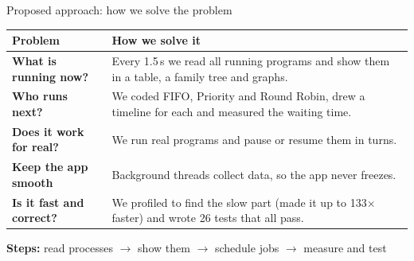 \documentclass[aspectratio=169,11pt]{beamer}
\begin{document}
\begin{frame}{Proposed approach: how we solve the problem}
  \centering
  \begin{tabular}{>{\raggedright\arraybackslash}p{}>{\raggedright\arraybackslash}p{}}
    \toprule
    \textbf{Problem} & \textbf{How we solve it} \\
    \midrule
    \textbf{What is running now?} &
      Every 1.5\,s we read all running programs and show them in a table,
      a family tree and graphs. \\ \addlinespace[7pt]
    \textbf{Who runs next?} &
      We coded FIFO, Priority and Round Robin, drew a timeline for each
      and measured the waiting time. \\ \addlinespace[7pt]
    \textbf{Does it work for real?} &
      We run real programs and pause or resume them in turns. \\ \addlinespace[7pt]
    \textbf{Keep the app smooth} &
      Background threads collect data, so the app never freezes. \\ \addlinespace[7pt]
    \textbf{Is it fast and correct?} &
      We profiled to find the slow part (made it up to 133\(\times\) faster)
      and wrote 26 tests that all pass. \\
    \bottomrule
  \end{tabular}
  \vspace{0.4cm}

  \textbf{Steps:} read processes \(\rightarrow\) show them \(\rightarrow\)
  schedule jobs \(\rightarrow\) measure and test
\end{frame}
\end{document}

